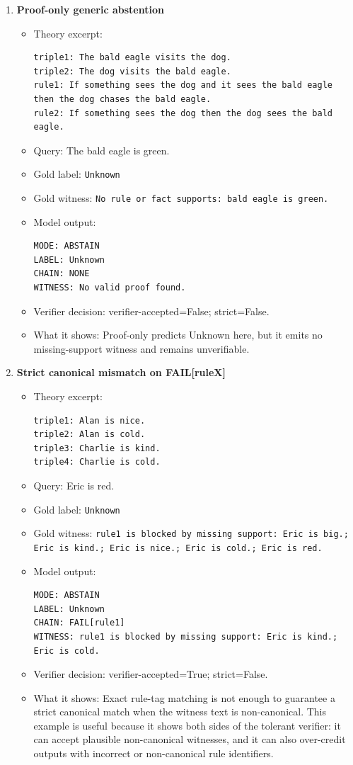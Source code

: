 \begin{enumerate}
\item \textbf{Proof-only generic abstention}
\begin{itemize}
\item Theory excerpt:
\begin{verbatim}
triple1: The bald eagle visits the dog.
triple2: The dog visits the bald eagle.
rule1: If something sees the dog and it sees the bald eagle then the dog chases the bald eagle.
rule2: If something sees the dog then the dog sees the bald eagle.
\end{verbatim}
\item Query: The bald eagle is green.
\item Gold label: \texttt{Unknown}
\item Gold witness: \texttt{No rule or fact supports: bald eagle is green.}
\item Model output:
\begin{verbatim}
MODE: ABSTAIN
LABEL: Unknown
CHAIN: NONE
WITNESS: No valid proof found.
\end{verbatim}
\item Verifier decision: verifier-accepted=False; strict=False.
\item What it shows: Proof-only predicts Unknown here, but it emits no missing-support witness and remains unverifiable.
\end{itemize}

\item \textbf{Strict canonical mismatch on FAIL[ruleX]}
\begin{itemize}
\item Theory excerpt:
\begin{verbatim}
triple1: Alan is nice.
triple2: Alan is cold.
triple3: Charlie is kind.
triple4: Charlie is cold.
\end{verbatim}
\item Query: Eric is red.
\item Gold label: \texttt{Unknown}
\item Gold witness: \texttt{rule1 is blocked by missing support: Eric is big.; Eric is kind.; Eric is nice.; Eric is cold.; Eric is red.}
\item Model output:
\begin{verbatim}
MODE: ABSTAIN
LABEL: Unknown
CHAIN: FAIL[rule1]
WITNESS: rule1 is blocked by missing support: Eric is kind.; Eric is cold.
\end{verbatim}
\item Verifier decision: verifier-accepted=True; strict=False.
\item What it shows: Exact rule-tag matching is not enough to guarantee a strict canonical match when the witness text is non-canonical. This example is useful because it shows both sides of the tolerant verifier: it can accept plausible non-canonical witnesses, and it can also over-credit outputs with incorrect or non-canonical rule identifiers.
\end{itemize}
\end{enumerate}
